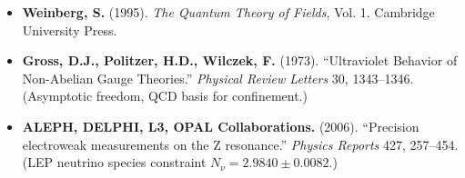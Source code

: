 \documentclass[
  11pt,
  letterpaper,
]{article}
\begin{document}
\begin{itemize}
{  Values of the Fundamental Physical Constants.} NIST.
\item
  \textbf{Weinberg, S.} (1995). \emph{The Quantum Theory of Fields},
  Vol. 1. Cambridge University Press.
\item
  \textbf{Gross, D.J., Politzer, H.D., Wilczek, F.} (1973).
  ``Ultraviolet Behavior of Non-Abelian Gauge Theories.'' \emph{Physical
  Review Letters} 30, 1343--1346. (Asymptotic freedom, QCD basis for
  confinement.)
\item
  \textbf{ALEPH, DELPHI, L3, OPAL Collaborations.} (2006). ``Precision
  electroweak measurements on the Z resonance.'' \emph{Physics Reports}
  427, 257--454. (LEP neutrino species constraint
  \(N_\nu = 2.9840 \pm 0.0082\).)
\end{itemize}
\end{document}
